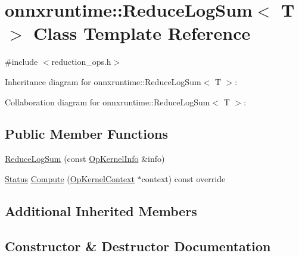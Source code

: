 \hypertarget{classonnxruntime_1_1ReduceLogSum}{}\section{onnxruntime\+:\+:Reduce\+Log\+Sum$<$ T $>$ Class Template Reference}
\label{classonnxruntime_1_1ReduceLogSum}


{\ttfamily \#include $<$reduction\+\_\+ops.\+h$>$}



Inheritance diagram for onnxruntime\+:\+:Reduce\+Log\+Sum$<$ T $>$\+:


Collaboration diagram for onnxruntime\+:\+:Reduce\+Log\+Sum$<$ T $>$\+:
\subsection*{Public Member Functions}
\begin{DoxyCompactItemize}
\item 
\mbox{\hyperlink{classonnxruntime_1_1ReduceLogSum_a3019a48e4e3830dc3e221f68ff439075}{Reduce\+Log\+Sum}} (const \mbox{\hyperlink{classonnxruntime_1_1OpKernelInfo}{Op\+Kernel\+Info}} \&info)
\item 
\mbox{\hyperlink{classonnxruntime_1_1common_1_1Status}{Status}} \mbox{\hyperlink{classonnxruntime_1_1ReduceLogSum_a765bc011072315b0eaf48c9e45fdfd2b}{Compute}} (\mbox{\hyperlink{classonnxruntime_1_1OpKernelContext}{Op\+Kernel\+Context}} $\ast$context) const override
\end{DoxyCompactItemize}
\subsection*{Additional Inherited Members}


\subsection{Constructor \& Destructor Documentation}
\mbox{\label{classonnxruntime_1_1ReduceLogSum_a3019a48e4e3830dc3e221f68ff439075}} 
